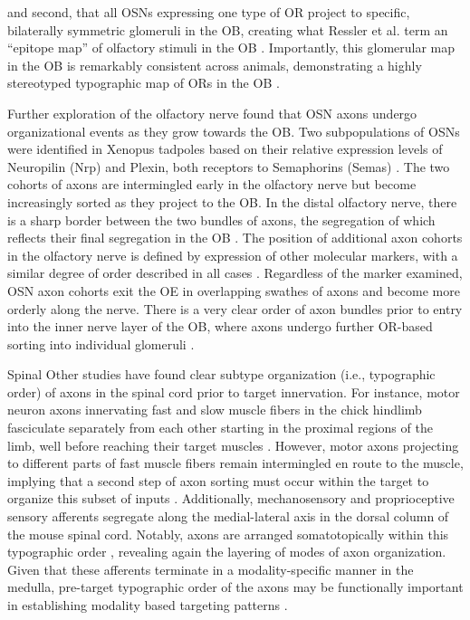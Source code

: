  and second, that all OSNs expressing one type of OR project to specific, bilaterally symmetric glomeruli in the OB, creating what Ressler et al. term an “epitope map” of olfactory stimuli in the OB \cite{ressler1994information,vassar1994topographic}.
Importantly, this glomerular map in the OB is remarkably consistent across animals, demonstrating a highly stereotyped typographic map of ORs in the OB \cite{ressler1994information,vassar1994topographic}. 
 
Further exploration of the olfactory nerve found that OSN axons undergo organizational events as they grow towards the OB.
Two subpopulations of OSNs were identified in Xenopus tadpoles based on their relative expression levels of Neuropilin (Nrp) and Plexin, both receptors to Semaphorins (Semas) \cite{satoda1995differential}.
The two cohorts of axons are intermingled early in the olfactory nerve but become increasingly sorted as they project to the OB.
In the distal olfactory nerve, there is a sharp border between the two bundles of axons, the segregation of which reflects their final segregation in the OB \cite{satoda1995differential}.
The position of additional axon cohorts in the olfactory nerve is defined by expression of other molecular markers, with a similar degree of order described in all cases \cite{imai2009pre,miller2010axon}.
Regardless of the marker examined, OSN axon cohorts exit the OE in overlapping swathes of axons and become more orderly along the nerve.
There is a very clear order of axon bundles prior to entry into the inner nerve layer of the OB, where axons undergo further OR-based sorting into individual glomeruli \cite{imai2009pre,miller2010axon}.

Spinal
Other studies have found clear subtype organization (i.e., typographic order) of axons in the spinal cord prior to target innervation.
For instance, motor neuron axons innervating fast and slow muscle fibers in the chick hindlimb fasciculate separately from each other starting in the proximal regions of the limb, well before reaching their target muscles \cite{milner1998selective}.
However, motor axons projecting to different parts of fast muscle fibers remain intermingled en route to the muscle, implying that a second step of axon sorting must occur within the target to organize this subset of inputs \cite{milner1998selective}.
Additionally, mechanosensory and proprioceptive sensory afferents segregate along the medial-lateral axis in the dorsal column of the mouse spinal cord. Notably, axons are arranged somatotopically within this typographic order \cite{niu2013modality}, revealing again the layering of modes of axon organization.
Given that these afferents terminate in a modality-specific manner in the medulla, pre-target typographic order of the axons may be functionally important in establishing modality based targeting patterns \cite{niu2013modality}.

